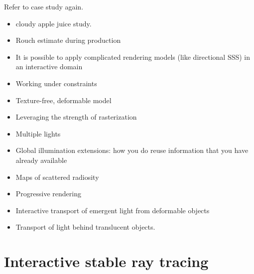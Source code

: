 Refer to case study again.

\begin{itemize}
\item cloudy apple juice study.
\item Rouch estimate during production
\item It is possible to apply complicated rendering models (like directional SSS) in an interactive domain
\item Working under constraints
\item Texture-free, deformable model
\item Leveraging the strength of rasterization
\item Multiple lights
\item Global illumination extensions: how you do reuse information that you have already available
\item Maps of scattered radiosity
\item Progressive rendering
\item Interactive transport of emergent light from deformable objects
\item Transport of light behind translucent objects.
\end{itemize}


\section{Interactive stable ray tracing}

